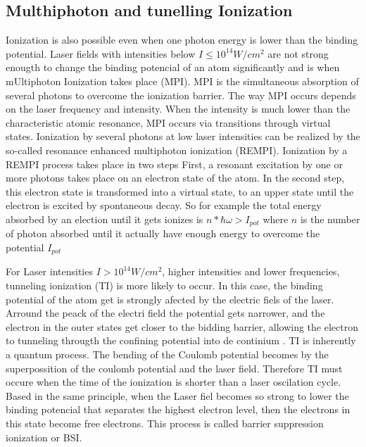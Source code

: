 \subsection{Multhiphoton and tunelling Ionization}

Ionization is also possible even when one photon energy is lower than the binding potential. Laser fields with intensities below $I \leqslant 10^{14}W/cm^{2}$ are not strong enougth to change the binding potencial of an atom significantly \cite{rhodes_multiphoton_1985} and is when mUltiphoton Ionization takes place (MPI).  MPI is the simultaneous absorption of several photons to overcome the ionization barrier. The way MPI occurs depends on the laser frequency and intensity. When the intensity is much lower than the characteristic atomic resonance, MPI occurs via transitions through virtual states. Ionization by several photons at low laser intensities can be realized by the so-called resonance enhanced multiphoton ionization (REMPI)\cite{mainfray_multiphoton_nodate}.  Ionization by a REMPI process takes place in two steps
First, a resonant excitation by one or more photons takes place on an electron state of the atom. In the second step, this electron state is transformed into a virtual state, to an upper state until the electron is excited by spontaneous decay. So for example the total energy absorbed by an election until it gets ionizes is $n * \hbar\omega > I_{pot}$ where $n$ is the number of photon absorbed until it actually have enough energy to overcome the potential $I_{pot}$

For Laser intensities $I > 10^{14}W/cm^{2}$, higher intensities and lower frequencies, tunneling ionization (TI) is more likely to occur.  In this case, the binding potential of the atom get is strongly afected by the electric fiels of the laser. Arround the peack of the electri field the  potential gets narrower, and the electron in the outer states get closer to the bidding barrier, allowing the electron to tunneling througth the confining potential into de continium  \cite{griffiths_introduction_2013}. TI is inherently a quantum process. The bending of the Coulomb potential becomes by the superpossition of the coulomb potential and the laser field. Therefore TI must occure when the time of the ionization is shorter than a laser oscilation cycle\cite{berkowitz_photoabsorption_1979}. Based in the same principle, when the Laser fiel becomes so strong to lower the binding potencial that separates the highest electron level, then the electrons in this state become free electrons. This process is called barrier suppression ionization or BSI\cite{krishnan_doped_2011}.

